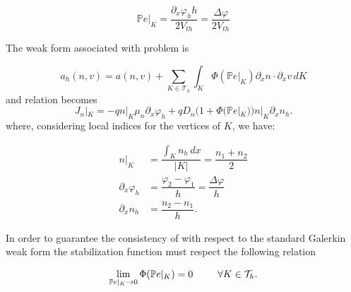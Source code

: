  \begin{equation*}
 \mathbb{P}e|_K = \dfrac{\partial_x \varphi_h h}{2V_{th}}  = \dfrac{\Delta \varphi }{2 V_{th}}
 \end{equation*}
 
The weak form associated with problem  is

\begin{equation}
\label{eq: weak form perturbed}
a_h(n,v) = a(n,v) + \sum_{K\in \mathcal{T}_h}\int_{K} \Phi(\mathbb{P}e|_K) \partial_x n \cdot \partial_x v \, dK
\end{equation}
and relation  becomes
\begin{equation}
\label{eq: j element 1d perturbata}
J_n|_K = -qn|_K\mu_n\partial_x \varphi_h + qD_n(1+\Phi(\mathbb{P}e|_K)) n|_K\partial_x n_h .
\end{equation}
where, considering local indices for the vertices of $K$, we have:

\begin{align*}
n|_K & = \dfrac{\int_K n_h \, dx}{|K|} = \dfrac{n_1+n_2}{2} \\
\partial_x \varphi_h & = \dfrac{\varphi_2-\varphi_1}{h} = \dfrac{\Delta \varphi}{h}\\
\partial_x n_h & = \dfrac{n_2 - n_1}{h}.
\end{align*}

In order to guarantee the consistency of  with respect to the standard Galerkin weak form the  stabilization function  must respect the following relation 

\begin{align}
\label{eq: consistenza}
\lim_{\mathbb{P}e|_K \to 0} \Phi(\mathbb{P}e|_K) = 0 \psp{15} \forall K\in\mathcal{T}_h.
\end{align}



